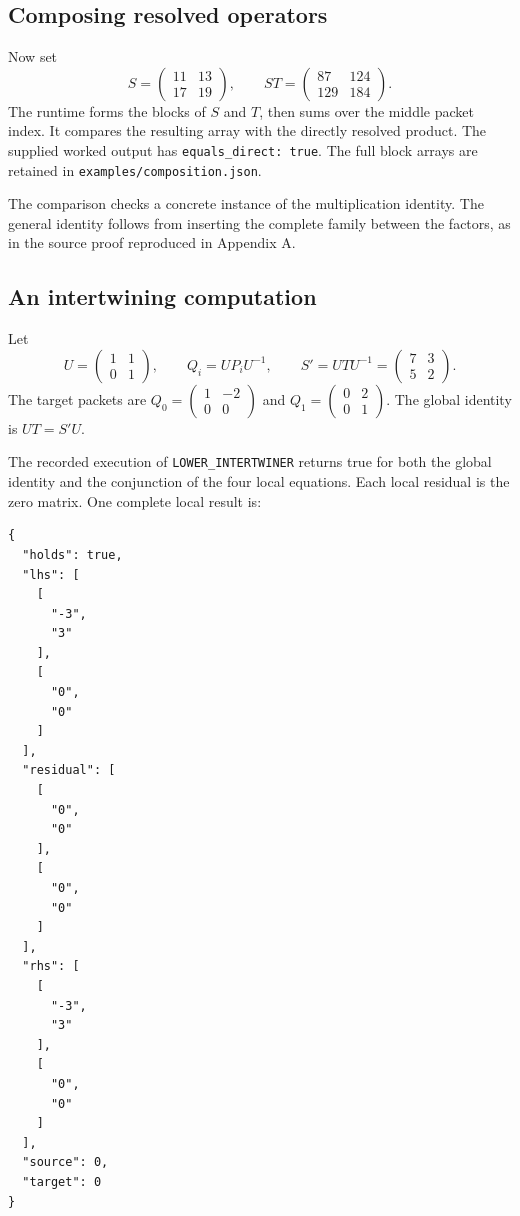 \documentclass[a4paper,11pt]{article}
\begin{document}
\subsection{Composing resolved operators}
Now set
\[
S=\begin{pmatrix}11&13\\17&19\end{pmatrix},\qquad
ST=\begin{pmatrix}87&124\\129&184\end{pmatrix}.
\]
The runtime forms the blocks of $S$ and $T$, then sums over the middle packet index. It compares the resulting array with the directly resolved product. The supplied worked output has \nolinkurl{equals_direct: true}. The full block arrays are retained in \nolinkurl{examples/composition.json}.

The comparison checks a concrete instance of the multiplication identity. The general identity follows from inserting the complete family between the factors, as in the source proof reproduced in Appendix A.
\subsection{An intertwining computation}
Let
\[
U=\begin{pmatrix}1&1\\0&1\end{pmatrix},\qquad
Q_i=UP_iU^{-1},\qquad
S'=UTU^{-1}=\begin{pmatrix}7&3\\5&2\end{pmatrix}.
\]
The target packets are $Q_0=\left(\begin{smallmatrix}1&-2\\0&0\end{smallmatrix}\right)$ and $Q_1=\left(\begin{smallmatrix}0&2\\0&1\end{smallmatrix}\right)$. The global identity is $UT=S'U$.

The recorded execution of \nolinkurl{LOWER_INTERTWINER} returns true for both the global identity and the conjunction of the four local equations. Each local residual is the zero matrix. One complete local result is:

\begin{lstlisting}
{
  "holds": true,
  "lhs": [
    [
      "-3",
      "3"
    ],
    [
      "0",
      "0"
    ]
  ],
  "residual": [
    [
      "0",
      "0"
    ],
    [
      "0",
      "0"
    ]
  ],
  "rhs": [
    [
      "-3",
      "3"
    ],
    [
      "0",
      "0"
    ]
  ],
  "source": 0,
  "target": 0
}
\end{lstlisting}
\end{document}
